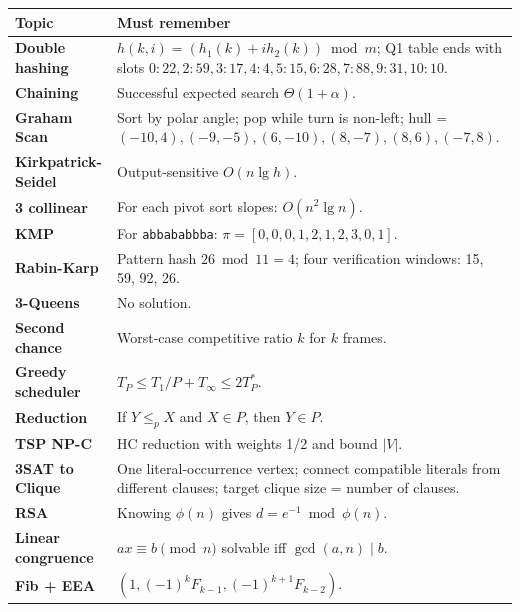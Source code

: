\documentclass[10.5pt,a4paper]{article}
\begin{document}
\begin{center}
\renewcommand{\arraystretch}{1.25}
\begin{tabularx}{\textwidth}{>{\bfseries}p{2cm} X}
\toprule
Topic & Must remember\\
\midrule
Double hashing & \(h(k,i)=(h_1(k)+ih_2(k))\bmod m\); Q1 table ends with slots \(0:22,2:59,3:17,4:4,5:15,6:28,7:88,9:31,10:10\).\\
Chaining & Successful expected search \(\Theta(1+\alpha)\).\\
Graham Scan & Sort by polar angle; pop while turn is non-left; hull = \((-10,4),(-9,-5),(6,-10),(8,-7),(8,6),(-7,8)\).\\
Kirkpatrick-Seidel & Output-sensitive \(O(n\lg h)\).\\
3 collinear & For each pivot sort slopes: \(O(n^2\lg n)\).\\
KMP & For \texttt{abbababbba}: \(\pi=[0,0,0,1,2,1,2,3,0,1]\).\\
Rabin-Karp & Pattern hash \(26\bmod11=4\); four verification windows: 15, 59, 92, 26.\\
3-Queens & No solution.\\
Second chance & Worst-case competitive ratio \(k\) for \(k\) frames.\\
Greedy scheduler & \(T_P\le T_1/P+T_\infty\le2T_P^*\).\\
Reduction & If \(Y\le_pX\) and \(X\in P\), then \(Y\in P\).\\
TSP NP-C & HC reduction with weights 1/2 and bound \(|V|\).\\
3SAT to Clique & One literal-occurrence vertex; connect compatible literals from different clauses; target clique size = number of clauses.\\
RSA & Knowing \(\phi(n)\) gives \(d=e^{-1}\bmod\phi(n)\).\\
Linear congruence & \(ax\equiv b\pmod n\) solvable iff \(\gcd(a,n)\mid b\).\\
Fib + EEA & \((1,(-1)^kF_{k-1},(-1)^{k+1}F_{k-2})\).\\
\bottomrule
\end{tabularx}
\end{center}
\end{document}
